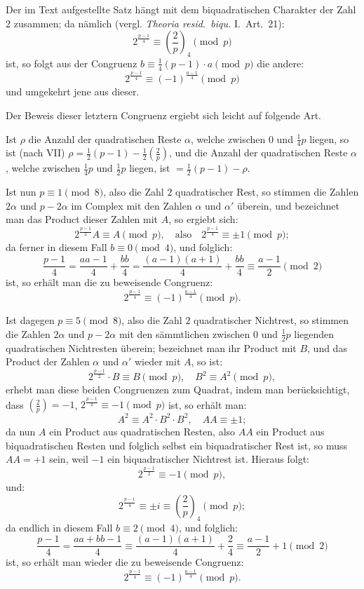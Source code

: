 \documentclass[12pt,a4paper]{article}
\begin{document}
Der im Text aufgestellte Satz hängt mit dem biquadratischen Charakter der Zahl $2$ zusammen; da
nämlich (vergl. \textit{Theoria resid.~biqu.} I.~Art.~21):
\[
2^{\frac{p-1}{4}} \equiv \left(\frac{2}{p}\right)_{\!4} \pmod{p}
\]
ist, so folgt aus der Congruenz $b \equiv \frac{1}{4}(p - 1) \cdot a \pmod{p}$ die andere:
\[
2^{\frac{p-1}{4}} \equiv (-1)^{\frac{a-1}{4}} \pmod{p}
\]
und umgekehrt jene aus dieser.

Der Beweis dieser letztern Congruenz ergiebt sich leicht auf folgende Art.

Ist $\rho$ die Anzahl der quadratischen Reste $\alpha$, welche zwischen $0$ und $\frac{1}{4}p$ liegen, so ist
(nach VII) $\rho = \frac{1}{2}(p - 1) - \frac{1}{2}\left(\frac{2}{p}\right)$, und die Anzahl der quadratischen Reste $\alpha$, welche zwischen
$\frac{1}{4}p$ und $\frac{1}{2}p$ liegen, ist $= \frac{1}{2}(p - 1) - \rho$.

Ist nun $p \equiv 1 \pmod{8}$, also die Zahl $2$ quadratischer Rest, so stimmen die Zahlen $2\alpha$
und $p - 2\alpha$ im Complex mit den Zahlen $\alpha$ und $\alpha'$ überein, und bezeichnet man das Product
dieser Zahlen mit $A$, so ergiebt sich:
\[
2^{\frac{p-1}{2}} A \equiv A \pmod{p}, \quad \text{also} \quad 2^{\frac{p-1}{4}} \equiv \pm 1 \pmod{p};
\]
da ferner in diesem Fall $b \equiv 0 \pmod{4}$, und folglich:
\[
\frac{p - 1}{4} = \frac{aa - 1}{4} + \frac{bb}{4} = \frac{(a - 1)(a + 1)}{4} + \frac{bb}{4} \equiv \frac{a - 1}{2} \pmod{2}
\]
ist, so erhält man die zu beweisende Congruenz:
\[
2^{\frac{p-1}{4}} \equiv (-1)^{\frac{a-1}{4}} \pmod{p}.
\]


Ist dagegen $p \equiv 5 \pmod{8}$, also die Zahl $2$ quadratischer Nichtrest, so stimmen die Zahlen
$2\alpha$ und $p - 2\alpha$ mit den sämmtlichen zwischen $0$ und $\frac{1}{2}p$ liegenden quadratischen Nichtresten
überein; bezeichnet man ihr Product mit $B$, und das Product der Zahlen $\alpha$ und $\alpha'$ wieder mit $A$,
so ist:
\[
2^{\frac{p-1}{2}} \cdot B \equiv B \pmod{p}, \quad B^2 \equiv A^2 \pmod{p},
\]
erhebt man diese beiden Congruenzen zum Quadrat, indem man berücksichtigt, dass
$\left(\frac{2}{p}\right) = -1$, $2^{\frac{p-1}{2}} \equiv -1 \pmod{p}$ ist, so erhält man:
\[
A^2 \equiv A^2 \cdot B^2 \cdot B^2, \quad AA \equiv \pm 1;
\]
da nun $A$ ein Product aus quadratischen Resten, also $AA$ ein Product aus biquadratischen Resten und
folglich selbst ein biquadratischer Rest ist, so muss $AA = +1$ sein, weil $-1$ ein biquadratischer
Nichtrest ist. Hieraus folgt:
\[
2^{\frac{p-1}{2}} \equiv -1 \pmod{p},
\]
und:
\[
2^{\frac{p-1}{4}} \equiv \pm i \equiv \left(\frac{2}{p}\right)_{\!4} \pmod{p};
\]
da endlich in diesem Fall $b \equiv 2 \pmod{4}$, und folglich:
\[
\frac{p - 1}{4} = \frac{aa + bb - 1}{4} \equiv \frac{(a - 1)(a + 1)}{4} + \frac{2}{4} \equiv \frac{a - 1}{2} + 1 \pmod{2}
\]
ist, so erhält man wieder die zu beweisende Congruenz:
\[
2^{\frac{p-1}{4}} \equiv (-1)^{\frac{a-1}{4}} \pmod{p}.
\]
\end{document}
